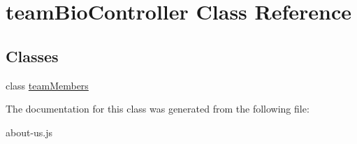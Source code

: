 \hypertarget{classteamBioController}{\section{team\-Bio\-Controller Class Reference}
\label{classteamBioController}
}
\subsection*{Classes}
\begin{DoxyCompactItemize}
\item 
class \hyperlink{classteamBioController_1_1teamMembers}{team\-Members}
\end{DoxyCompactItemize}


The documentation for this class was generated from the following file\-:\begin{DoxyCompactItemize}
\item 
about-\/us.\-js\end{DoxyCompactItemize}
